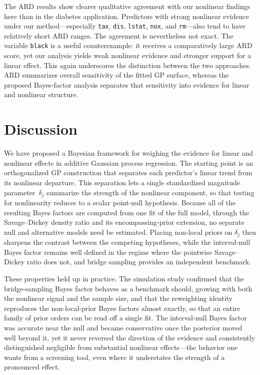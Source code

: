 \documentclass{article}
\begin{document}
The ARD results show clearer qualitative agreement with our nonlinear findings here than in the diabetes application. Predictors with strong nonlinear evidence under our method—especially \texttt{tax}, \texttt{dis}, \texttt{lstat}, \texttt{nox}, and \texttt{rm}—also tend to have relatively short ARD ranges. The agreement is nevertheless not exact. The variable \texttt{black} is a useful counterexample: it receives a comparatively large ARD score, yet our analysis yields weak nonlinear evidence and stronger support for a linear effect. This again underscores the distinction between the two approaches. ARD summarizes overall sensitivity of the fitted GP surface, whereas the proposed Bayes-factor analysis separates that sensitivity into evidence for linear and nonlinear structure.

\section{Discussion\label{sec:discussion}}

We have proposed a Bayesian framework for weighing the evidence for
linear and nonlinear effects in additive Gaussian process regression.
The starting point is an orthogonalized GP construction that separates
each predictor's linear trend from its nonlinear departure. This
separation lets a single standardized magnitude parameter~$\delta_j$
summarize the strength of the nonlinear component, so that testing for
nonlinearity reduces to a scalar point-null hypothesis. Because all of
the resulting Bayes factors are computed from one fit of the full model,
through the Savage--Dickey density ratio and its encompassing-prior
extension, no separate null and alternative models need be estimated.
Placing non-local priors on $\delta_j$ then sharpens the contrast
between the competing hypotheses, while the interval-null Bayes factor
remains well defined in the regime where the pointwise Savage--Dickey
ratio does not, and bridge sampling provides an independent benchmark.

These properties held up in practice. The simulation study confirmed
that the bridge-sampling Bayes factor behaves as a benchmark should,
growing with both the nonlinear signal and the sample size, and that
the reweighting identity reproduces the non-local-prior Bayes factors
almost exactly, so that an entire family of prior orders can be read off
a single fit. The interval-null Bayes factor was accurate near the null
and became conservative once the posterior moved well beyond it, yet it
never reversed the direction of the evidence and consistently
distinguished negligible from substantial nonlinear effects---the
behavior one wants from a screening tool, even where it understates the
strength of a pronounced effect.
\end{document}

